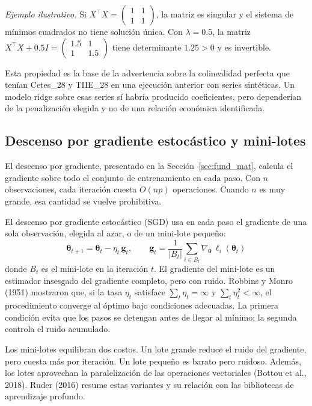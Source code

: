 \textit{Ejemplo ilustrativo.} Si $X^\top X=\begin{pmatrix}1&1\\1&1\end{pmatrix}$, la matriz es singular y el sistema de mínimos cuadrados no tiene solución única. Con $\lambda=0.5$, la matriz $X^\top X+0.5I=\begin{pmatrix}1.5&1\\1&1.5\end{pmatrix}$ tiene determinante $1.25>0$ y es invertible.

Esta propiedad es la base de la advertencia sobre la colinealidad perfecta que tenían Cetes\_28 y TIIE\_28 en una ejecución anterior con series sintéticas. Un modelo ridge sobre esas series sí habría producido coeficientes, pero dependerían de la penalización elegida y no de una relación económica identificada.

\subsection{Descenso por gradiente estocástico y mini-lotes}
El descenso por gradiente, presentado en la Sección~\ref{sec:fund_mat}, calcula el gradiente sobre todo el conjunto de entrenamiento en cada paso. Con $n$ observaciones, cada iteración cuesta $O(np)$ operaciones. Cuando $n$ es muy grande, esa cantidad se vuelve prohibitiva.

El descenso por gradiente estocástico (SGD) usa en cada paso el gradiente de una sola observación, elegida al azar, o de un mini-lote pequeño:
\begin{equation}
\boldsymbol{\theta}_{t+1}=\boldsymbol{\theta}_t-\eta_t\,\mathbf{g}_t, \qquad \mathbf{g}_t=\frac{1}{|B_t|}\sum_{i\in B_t}\nabla_{\boldsymbol{\theta}}\,\ell_i(\boldsymbol{\theta}_t)
\label{eq:sgd}
\end{equation}
donde $B_t$ es el mini-lote en la iteración $t$. El gradiente del mini-lote es un estimador insesgado del gradiente completo, pero con ruido. Robbins y Monro (1951) mostraron que, si la tasa $\eta_t$ satisface $\sum_t\eta_t=\infty$ y $\sum_t\eta_t^2<\infty$, el procedimiento converge al óptimo bajo condiciones adecuadas. La primera condición evita que los pasos se detengan antes de llegar al mínimo; la segunda controla el ruido acumulado.

Los mini-lotes equilibran dos costos. Un lote grande reduce el ruido del gradiente, pero cuesta más por iteración. Un lote pequeño es barato pero ruidoso. Además, los lotes aprovechan la paralelización de las operaciones vectoriales (Bottou et al., 2018). Ruder (2016) resume estas variantes y su relación con las bibliotecas de aprendizaje profundo.

